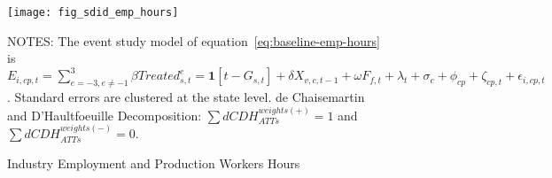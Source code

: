 \begin{figure}[H]
    \centering
    \texttt{[image: fig\_sdid\_emp\_hours]}
    \caption{Industry Employment and Production Workers Hours}
    \label{fig:baseline-employment-hours}
    \begin{minipage}{14cm}
        \vspace{0.05in}
        NOTES: The event study model of equation~\ref{eq:baseline-emp-hours} is $E_{i,cp,t} = \sum_{{e = -3},{e \neq -1}}^{3} \beta Treated_{s,t}^e = \textbf{1}[t - G_{s,t}] + \delta X_{v,c,t-1} + \omega F_{f,t} + \lambda_{t} + \sigma_{c} + \phi_{cp} + \zeta_{cp,t} + \epsilon_{i,cp,t}$. Standard errors are clustered at the state level. de Chaisemartin and D'Haultfoeuille Decomposition: $\sum dCDH_{ATTs}^{weights(+)} = 1$ and $\sum dCDH_{ATTs}^{weights(-)} = 0$.
    \end{minipage}
\end{figure}